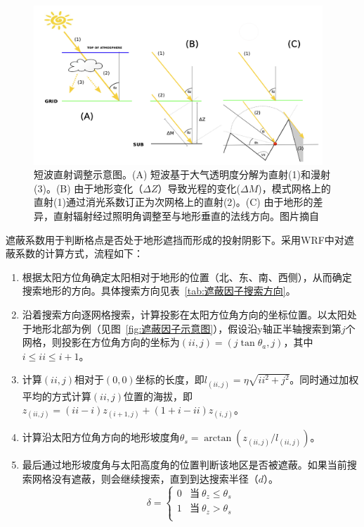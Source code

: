 {
\begin{figure}[htbp]
\centering
\includegraphics[width=0.97\textwidth]{Figures/尺度转换/短波直射调整图.png}
\caption[短波直射调整示意图]{短波直射调整示意图。(A) 短波基于大气透明度分解为直射(1)和漫射(3)。(B) 由于地形变化（$\Delta Z$）导致光程的变化($\Delta M$)，模式网格上的直射(1)通过消光系数订正为次网格上的直射(2)。(C) 由于地形的差异，直射辐射经过照明角调整至与地形垂直的法线方向。图片摘自~\citep{fiddes2014toposcale}}
\label{fig:短波直射调整图}
\end{figure}
}

遮蔽系数用于判断格点是否处于地形遮挡而形成的投射阴影下。采用WRF中对遮蔽系数的计算方式，流程如下：
\begin{enumerate}
    \item 根据太阳方位角确定太阳相对于地形的位置（北、东、南、西侧），从而确定搜索地形的方向。具体搜索方向见表~\ref{tab:遮蔽因子搜索方向}。
    \item 沿着搜索方向逐网格搜索，计算投影在太阳方位角方向的坐标位置。以太阳处于地形北部为例（见图~\ref{fig:遮蔽因子示意图}），假设沿y轴正半轴搜索到第$j$个网格，则投影在方位角方向的坐标为$(ii,j)=(j \tan\theta_{a},j)$，其中$i \leqslant ii \leqslant i+1$。
    \item 计算$(ii,j)$相对于$(0,0)$坐标的长度，即$l_{\left(ii,j\right)}=\eta\sqrt{ii^{2}+j^{2}}$。同时通过加权平均的方式计算$(ii,j)$位置的海拔，即$z_{\left(ii,j\right)}=\left(ii-i\right)z_{\left(i+1,j\right)}+\left(1+i-ii\right)z_{\left(i,j\right)}$。
    \item 计算沿太阳方位角方向的地形坡度角$\theta_{s}=\arctan\left(z_{\left(ii,j\right)}/l_{\left(ii,j\right)}\right)$。
    \item 最后通过地形坡度角与太阳高度角的位置判断该地区是否被遮蔽。如果当前搜索网格没有遮蔽，则会继续搜索，直到到达搜索半径（$d$）。
    \begin{equation}
    \delta=\begin{cases}
        0 & \text{当}\ \theta_{z} \leqslant \theta_{s} \\
        1 & \text{当}\ \theta_{z} > \theta_{s} \\ 
    \end{cases}
    \end{equation}
\end{enumerate}


